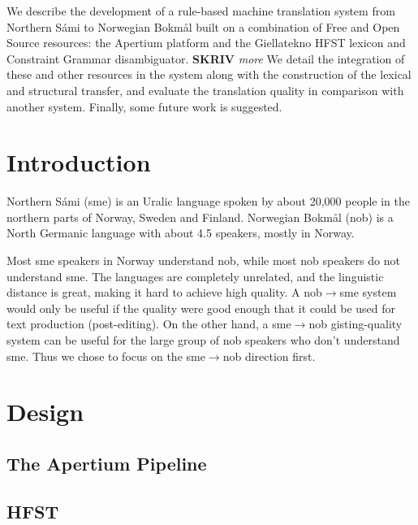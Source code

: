 \newcommand{\comment}[1]{\textbf{SKRIV} {\it #1}}




  
    We describe the development of a rule-based machine translation
    system from Northern Sámi to Norwegian Bokmål built on a
    combination of Free and Open Source resources: the Apertium
    platform and the Giellatekno HFST lexicon and Constraint Grammar
    disambiguator.
    \comment{more}
    We detail the integration of these and other resources in the
    system along with the construction of the lexical and structural
    transfer, and evaluate the translation quality in comparison with
    another system. Finally, some future work is suggested.




\section{Introduction}
Northern Sámi (sme) is an Uralic language spoken by about 20,000
people in the northern parts of Norway, Sweden and Finland. Norwegian
Bokmål (nob) is a North Germanic language with about 4.5 speakers,
mostly in Norway.

Most sme speakers in Norway understand nob, while most nob speakers do
not understand sme. The languages are completely unrelated, and the
linguistic distance is great, making it hard to achieve high quality.
A nob$\rightarrow{}$sme system would only be useful if the quality
were good enough that it could be used for text production
(post-editing). On the other hand, a sme$\rightarrow{}$nob
gisting-quality system can be useful for the large group of nob
speakers who don't understand sme. Thus we chose to focus on the
sme$\rightarrow{}$nob direction first.


\section{Design}
 \label{sec:design}
\subsection{The Apertium Pipeline}
\subsection{HFST}


